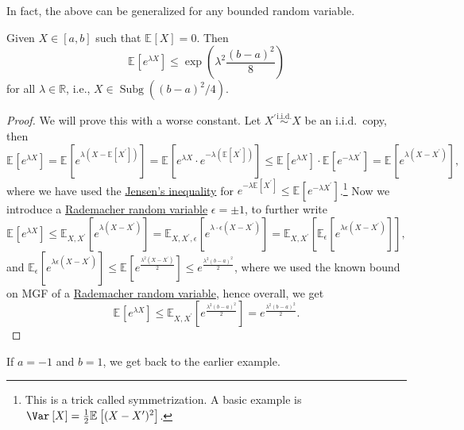 In fact, the above can be generalized for any bounded random variable.

\begin{lemma}\label{lma:bounded-rv-is-sub-gaussian}
	Given \(X\in [a, b]\) such that \(\mathbb{E}_{}\left[X \right] = 0\). Then
	\[
		\mathbb{E}_{}\left[e^{\lambda X} \right] \leq \exp (\lambda ^2 \frac{(b-a)^2}{8})
	\]
	for all \(\lambda \in \mathbb{R} \), i.e., \(X\in \mathop{\mathrm{Subg}}((b-a)^2 / 4) \).
\end{lemma}
\begin{proof}
	We will prove this with a worse constant. Let \(X^{\prime} \overset{\text{i.i.d.} }{\sim } X\) be an i.i.d.\ copy, then
	\[
		\mathbb{E}_{}\left[e^{\lambda X} \right]
		= \mathbb{E}_{}\left[e^{\lambda (X - \mathbb{E}_{}\left[X^{\prime}  \right] )} \right]
		= \mathbb{E}_{}\left[e^{\lambda X}\cdot e^{-\lambda (\mathbb{E}_{}\left[X^{\prime}  \right] )} \right]
		\leq \mathbb{E}_{}\left[e^{\lambda X} \right] \cdot \mathbb{E}_{}\left[e^{-\lambda X^{\prime} } \right]
		= \mathbb{E}_{}\left[e^{\lambda (X - X^{\prime} )} \right],
	\]
	where we have used the \href{https://en.wikipedia.org/wiki/Jensen%27s_inequality}{Jensen's inequality} for \(e^{-\lambda \mathbb{E}_{}\left[X^{\prime}  \right] } \leq \mathbb{E}_{}\left[e^{-\lambda X^{\prime} } \right] \).\footnote{This is a trick called symmetrization. A basic example is \(\Var_{}\left[X \right] = \frac{1}{2} \mathbb{E}_{}\left[(X - X^{\prime} )^2 \right] \).} Now we introduce a \hyperref[eg:Rademacher-random-varaible]{Rademacher random variable} \(\epsilon = \pm 1\), to further write
	\[
		\mathbb{E}_{}\left[e^{\lambda X} \right]
		\leq \mathbb{E}_{X, X^{\prime} }\left[e^{\lambda (X - X^{\prime} )} \right]
		= \mathbb{E}_{X, X^{\prime} , \epsilon }\left[ e^{\lambda \cdot \epsilon (X - X^{\prime} )} \right]
		= \mathbb{E}_{X, X^{\prime} }\left[ \mathbb{E}_{\epsilon }\left[e^{\lambda \epsilon (X - X^{\prime} )} \right]  \right] ,
	\]
	and \(\mathbb{E}_{\epsilon }\left[ e^{\lambda \epsilon (X - X^{\prime} )} \right] \leq \mathbb{E}_{}\left[e^{\frac{\lambda ^2(X - X^{\prime} )}{2}} \right] \leq e^{\frac{\lambda ^2(b - a)^2}{2}} \), where we used the known bound on MGF of a \hyperref[eg:Rademacher-random-varaible]{Rademacher random variable}, hence overall, we get
	\[
		\mathbb{E}_{}\left[e^{\lambda X} \right] \leq \mathbb{E}_{X, X^{\prime} }\left[e^{\frac{\lambda ^2(b-a)^2}{2}} \right] = e^{\frac{\lambda ^2(b-a)^2}{2}}.
	\]
\end{proof}

\begin{note}
	If \(a = -1\) and \(b = 1\), we get back to the earlier example.
\end{note}


